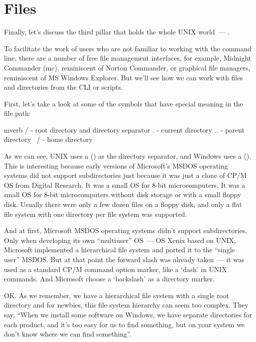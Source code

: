 \section*{Files}

Finally, let's discuss the third pillar that holds the whole UNIX world~---
.

To facilitate the work of users who are not familiar to working with
the command line, there are a number of free file management interfaces,
for example, Midnight Commander (mc), reminiscent of Norton Commander, or
graphical file managers, reminiscent of MS Windows Explorer. But we'll see
how we can work with files and directories from the CLI or scripts.

First, let's take a look at some of the symbols that have special meaning
in the file path:
\begin{code}{mverb}
/    - root directory and directory separator
.    - current directory
..  - parent directory
~/  - home directory
\end{code}

As we can see, UNIX uses a  (\cmd{/}) as the directory separator,
and Windows uses a  (\cmd{\textbackslash}). This is interesting
because early versions of Microsoft's MSDOS operating systems did not support
subdirectories just because it was just a clone of CP/M OS from Digital Research. It was
a small OS for 8-bit microcomputers. It was a small OS for 8-bit
microcomputers without disk storage or with a small floppy disk. Usually
there were only a few dozen files on a floppy disk, and only a flat file
system with one directory per file system was supported.

And at first, Microsoft MSDOS operating systems didn't support subdirectories.
Only when developing its own ``multiuser'' OS~--- OS Xenix based on UNIX,
Microsoft implemented a hierarchical file system and ported it to
the ``single user'' MSDOS. But at that point the forward slash was already
taken~--- it was used as a standard CP/M command option marker,
like a `dash' in UNIX commands. And Microsoft choose a `backslash' as
a directory marker.

OK. As we remember, we have a hierarchical file system with a single root
directory and for newbies, this file system hierarchy can seem too complex.
They say, ``When we install some software on Windows, we have separate
directories for each product, and it's too easy for us to find something,
but on your system we don't know where we can find something''.

